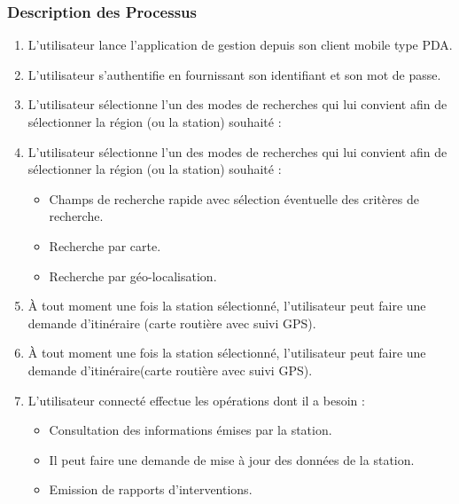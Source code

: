 \subsubsection{Description des Processus}

\begin{enumerate}
\item L'utilisateur lance l'application de gestion depuis son client mobile type PDA.\\
\item L'utilisateur s'authentifie en fournissant son identifiant et son mot de passe.\\

\item L'utilisateur sélectionne l'un des modes de recherches qui lui convient afin de sélectionner
 la région (ou la station) souhaité :\\

\item L'utilisateur sélectionne l'un des modes de recherches qui lui convient afin de sélectionner la région (ou la station) souhaité :\\

	\begin{itemize}
	\item Champs de recherche rapide avec sélection éventuelle des critères de recherche.\\

	\item Recherche par carte.\\

	\item Recherche par géo-localisation.\\
	
	\end{itemize}


	\item À tout moment une fois la station sélectionné, l'utilisateur peut faire une demande 
	d'itinéraire (carte routière avec suivi GPS).\\

	\item À tout moment une fois la station sélectionné, l'utilisateur peut faire une demande d'itinéraire(carte routière avec suivi GPS).\\

	\item L'utilisateur connecté effectue les opérations dont il a besoin :\\
	
	\begin{itemize}
	\item Consultation des informations émises par la station. \\
	\item Il peut faire une demande de mise à jour des données de la station.\\
	\item Emission de rapports d'interventions.\\


\end{itemize}
\end{enumerate}

